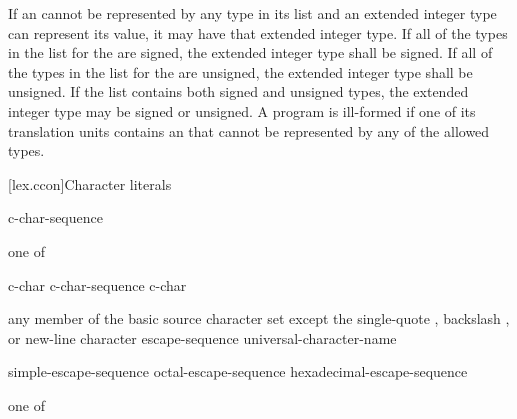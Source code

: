 \pnum
If an 
cannot be represented by any type in its list and
an extended integer type can represent its value,
it may have that extended integer type.
If all of the types in the list for the 
are signed,
the extended integer type shall be signed.
If all of the types in the list for the 
are unsigned,
the extended integer type shall be unsigned.
If the list contains both signed and unsigned types,
the extended integer type may be signed or unsigned.
A program is ill-formed
if one of its translation units contains an 
that cannot be represented by any of the allowed types.

[lex.ccon]{Character literals}

%
\begin{bnf}
\br
      c-char-sequence 
\end{bnf}

\begin{bnf}
 \textnormal{one of}\br
    \quad{}\quad{}\quad{}
\end{bnf}

\begin{bnf}
\br
    c-char\br
    c-char-sequence c-char
\end{bnf}

\begin{bnf}
\br
    \textnormal{any member of the basic source character set except the single-quote , backslash \terminal{\textbackslash}, or new-line character}\br
    escape-sequence\br
    universal-character-name
\end{bnf}

\begin{bnf}
\br
    simple-escape-sequence\br
    octal-escape-sequence\br
    hexadecimal-escape-sequence
\end{bnf}

\begin{bnf}
 \textnormal{one of}\br
    \quad{}\quad{}\quad\terminal{\textbackslash\textbackslash}\br
    \quad{}\quad{}\quad{}\quad{}\quad{}\quad{}
\end{bnf}


